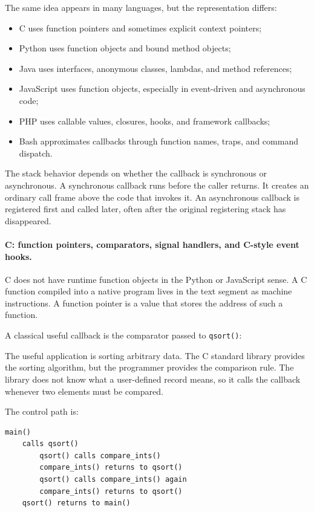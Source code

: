 The same idea appears in many languages, but the representation differs:

\begin{itemize}
    \item C uses function pointers and sometimes explicit context pointers;
    \item Python uses function objects and bound method objects;
    \item Java uses interfaces, anonymous classes, lambdas, and method references;
    \item JavaScript uses function objects, especially in event-driven and asynchronous code;
    \item PHP uses callable values, closures, hooks, and framework callbacks;
    \item Bash approximates callbacks through function names, traps, and command dispatch.
\end{itemize}

The stack behavior depends on whether the callback is synchronous or asynchronous. A synchronous callback runs before the caller returns. It creates an ordinary call frame above the code that invokes it. An asynchronous callback is registered first and called later, often after the original registering stack has disappeared.

\paragraph{C: function pointers, comparators, signal handlers, and C-style event hooks.}

C does not have runtime function objects in the Python or JavaScript sense. A C function compiled into a native program lives in the text segment as machine instructions. A function pointer is a value that stores the address of such a function.

A classical useful callback is the comparator passed to \texttt{qsort()}:

The useful application is sorting arbitrary data. The C standard library provides the sorting algorithm, but the programmer provides the comparison rule. The library does not know what a user-defined record means, so it calls the callback whenever two elements must be compared.

The control path is:

\begin{verbatim}
main()
    calls qsort()
        qsort() calls compare_ints()
        compare_ints() returns to qsort()
        qsort() calls compare_ints() again
        compare_ints() returns to qsort()
    qsort() returns to main()
\end{verbatim}

